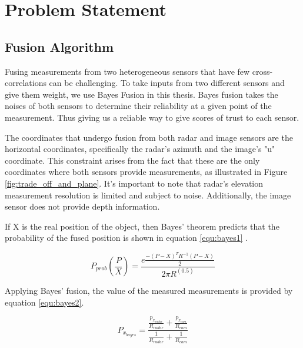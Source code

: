 

\chapter{Problem Statement}\label{chap:Problem_statement}

\section{Fusion Algorithm}\label{sec:2-bayes_fusion}
Fusing measurements from two heterogeneous sensors that have few cross-correlations can be challenging. 
To take inputs from two different sensors and give them weight, we use Bayes Fusion in this thesis.
Bayes fusion takes the noises of both sensors to determine their reliability at a given point of the measurement.
Thus giving us a reliable way to give scores of trust to each sensor.

The coordinates that undergo fusion from both radar and image sensors are the horizontal coordinates,
specifically the radar's azimuth and the image's "u" coordinate. 
This constraint arises from the fact that these are the only coordinates where both sensors provide measurements, 
as illustrated in Figure \ref{fig:trade_off_and_plane}.
It's important to note that radar's elevation measurement resolution is limited and subject to noise. 
Additionally, the image sensor does not provide depth information.

If X is the real position of the object, 
then Bayes' theorem predicts that the probability of the fused position is shown in equation \ref{equ:bayes1} \cite{10.1007/978-981-16-2248-9_32}.

\begin{equation}\label{equ:bayes1}
    P_{prob}(\frac{P}{X})=
    \frac
    {e \frac{−(P−X)^T R^{−1}(P−X)}{2}}
    {2 \pi R^(0.5)}
\end{equation}

Applying Bayes' fusion, the value of the measured measurements is provided by equation \ref{equ:bayes2}.

\begingroup
\large
\begin{equation}\label{equ:bayes2}
P_{x_{bayes}}=\frac
{\frac{p_{x_{radar}}}{R_{radar}}+\frac{p_{x_{cam}}} {R_{cam}}}
{\frac{1}{R_{radar}}+\frac{1}{R_{cam}}}
\end{equation}
\endgroup

